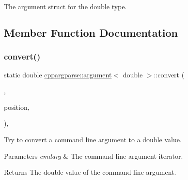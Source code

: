 The argument struct for the double type. 

\subsection{Member Function Documentation}
\mbox{\label{structcppargparse_1_1argument_3_01double_01_4_a19756d869b671553629d509f18549903}} 
\subsubsection{\texorpdfstring{convert()}{convert()}}
{\footnotesize\ttfamily static double \hyperlink{structcppargparse_1_1argument}{cppargparse\+::argument}$<$ double $>$\+::convert (\begin{DoxyParamCaption}\item[{const types\+::\+Command\+Line\+\_\+t \&}]{,  }\item[{const types\+::\+Command\+Line\+Position\+\_\+t \&}]{position,  }\item[{const types\+::\+Command\+Line\+Arguments\+\_\+t \&}]{ }\end{DoxyParamCaption})\hspace{0.3cm}{\ttfamily [inline]}, {\ttfamily [static]}}



Try to convert a command line argument to a double value. 


\begin{DoxyParams}{Parameters}
{\em cmdarg} & The command line argument iterator.\\
\hline
\end{DoxyParams}
\begin{DoxyReturn}{Returns}
The double value of the command line argument. 
\end{DoxyReturn}
\mbox{\label{structcppargparse_1_1argument_3_01double_01_4_aa587b4a64888fd195328d2491f893bc5}} 
